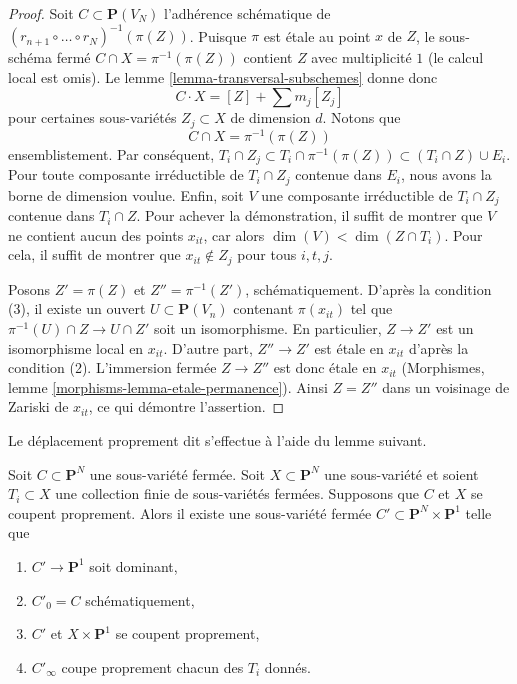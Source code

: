 \begin{proof}
\medskip\noindent
Soit $C \subset \mathbf{P}(V_N)$ l'adhérence schématique de
$(r_{n + 1} \circ \ldots \circ r_N)^{-1}(\pi(Z))$. Puisque $\pi$
est \'etale au point $x$ de $Z$, le sous-schéma fermé
$C \cap X = \pi^{-1}(\pi(Z))$
contient $Z$ avec multiplicité $1$ (le calcul local est omis).
Le lemme \ref{lemma-transversal-subschemes} donne donc
$$
C \cdot X = [Z] + \sum m_j[Z_j]
$$
pour certaines sous-variétés $Z_j \subset X$ de dimension $d$. Notons que
$$
C \cap X = \pi^{-1}(\pi(Z))
$$
ensemblistement. Par conséquent,
$T_i \cap Z_j \subset T_i \cap \pi^{-1}(\pi(Z)) \subset (T_i \cap Z) \cup E_i$.
Pour toute composante irréductible de $T_i \cap Z_j$ contenue dans $E_i$, nous
avons la borne de dimension voulue. Enfin, soit $V$ une composante irréductible
de $T_i \cap Z_j$ contenue dans $T_i \cap Z$. Pour achever
la démonstration, il suffit de montrer que $V$ ne contient aucun des
points $x_{it}$, car alors $\dim(V) < \dim(Z \cap T_i)$.
Pour cela, il suffit de montrer que $x_{it} \not \in Z_j$
pour tous $i, t, j$.

\medskip\noindent
Posons $Z' = \pi(Z)$ et $Z'' = \pi^{-1}(Z')$, schématiquement. D'après
la condition (3), il existe un ouvert $U \subset \mathbf{P}(V_n)$ contenant
$\pi(x_{it})$ tel que $\pi^{-1}(U) \cap Z \to U \cap Z'$ soit un isomorphisme.
En particulier, $Z \to Z'$ est un isomorphisme local en $x_{it}$.
D'autre part, $Z'' \to Z'$ est \'etale en $x_{it}$ d'après la condition (2).
L'immersion fermée $Z \to Z''$ est donc \'etale en $x_{it}$
(Morphismes, lemme \ref{morphisms-lemma-etale-permanence}).
Ainsi $Z = Z''$ dans un voisinage de Zariski de $x_{it}$, ce qui démontre
l'assertion.
\end{proof}

\noindent
Le déplacement proprement dit s'effectue à l'aide du lemme suivant.

\begin{lemma}
\label{lemma-move}
Soit $C \subset \mathbf{P}^N$ une sous-variété fermée.
Soit $X \subset \mathbf{P}^N$ une sous-variété et soient $T_i \subset X$
une collection finie de sous-variétés fermées.
Supposons que $C$ et $X$ se coupent proprement.
Alors il existe une sous-variété fermée
$C' \subset \mathbf{P}^N \times \mathbf{P}^1$ telle que
\begin{enumerate}
\item $C' \to \mathbf{P}^1$ soit dominant,
\item $C'_0 = C$ schématiquement,
\item $C'$ et $X \times \mathbf{P}^1$ se coupent proprement,
\item $C'_\infty$ coupe proprement chacun des $T_i$ donnés.
\end{enumerate}
\end{lemma}

